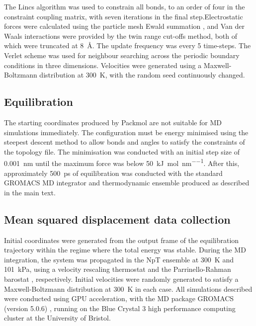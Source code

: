 The Lincs algorithm \cite{hess1997lincs} was used to constrain all bonds, to an order of four in the constraint coupling matrix, with seven iterations in the final step.Electrostatic forces were calculated using the particle mesh Ewald summation \cite{essmannSmoothParticleMesh1995}, and Van der Waals interactions were provided by the twin range cut-offs method, both of which were truncated at \SI{8}{\angstrom}. The update frequency was every \num{5} time-steps. The Verlet scheme \cite{pallFlexibleAlgorithmCalculating2013} was used for neighbour searching across the periodic boundary conditions in three dimensions. Velocities were generated using a Maxwell-Boltzmann distribution at \SI{300}{\kelvin}, with the random seed continuously changed.

\subsection{Equilibration}
 The starting coordinates produced by Packmol \cite{martinez2009packmol} are not suitable for MD simulations immediately. The configuration must be energy minimised using the steepest descent method to allow bonds and angles to satisfy the constraints of the topology file. The minimisation was conducted with an initial step size of \SI{0.001}{\nano\meter} until the maximum force was below \SI{50}{\kilo\joule\per\mole\per\nano\meter}. After this, approximately \SI{500}{\pico\second} of equilibration was conducted with the standard GROMACS MD integrator and thermodynamic ensemble produced as described in the main text. 

\subsection{Mean squared displacement data collection}
Initial coordinates were generated from the output frame of the equilibration trajectory within the regime where the total energy was stable. During the MD integration, the system was propagated in the NpT ensemble at \SI{300}{\kelvin} and \SI{101}{\kilo\pascal}, using a velocity rescaling thermostat \cite{bussiCanonicalSamplingVelocity2007} and the Parrinello-Rahman barostat \cite{parrinelloPolymorphicTransitionsSingle1981}, respectively. Initial velocities were randomly generated to satisfy a Maxwell-Boltzmann distribution at \SI{300}{\kelvin} in each case. All simulations described were conducted using GPU acceleration, with the MD package GROMACS (version 5.0.6) \cite{abrahamGROMACSHighPerformance2015}, running on the Blue Crystal 3 high performance computing cluster at the University of Bristol.

